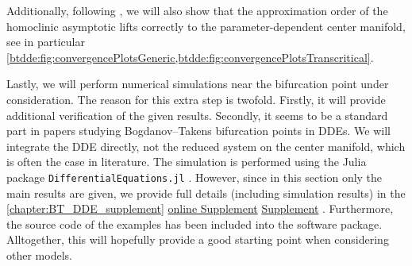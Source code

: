 Additionally, following \cite{Bosschaert@Interplay}, we will also show that the
approximation order of the homoclinic asymptotic lifts correctly to the
parameter-dependent center manifold, see in particular
\cref{btdde:fig:convergencePlotsGeneric,btdde:fig:convergencePlotsTranscritical}. 

Lastly, we will perform numerical simulations near the bifurcation point under
consideration. The reason for this extra step is twofold. Firstly, it will
provide additional verification of the given results. Secondly, it seems to be
a standard part in papers studying Bogdanov--Takens bifurcation points in
DDEs. We will integrate the DDE directly, not the reduced
system on the center manifold, which is often the case in literature. The
simulation is performed using the Julia package {\tt DifferentialEquations.jl}
\cite{rackauckas2017differentialequations}. However, since in this section only
the main results are given, we provide full details (including simulation
results) in the %
\ifthesis%
    \cref{chapter:BT_DDE_supplement}%
\fi%
\ifsiam%
    \hyperref[mysupplement]{online Supplement}%
\fi%
\ifarxiv%
    \hyperlink{mysupplement}{Supplement}%
\fi. Furthermore, the source
code of the examples has been included into the \DDEBIFTOOL software package.
Alltogether, this will hopefully provide a good starting point when considering other
models.

